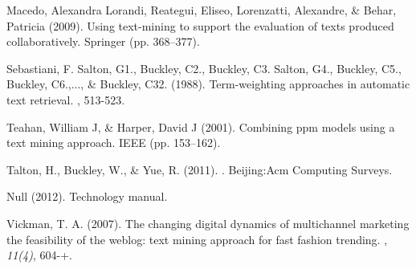 \begin{thebibliography}{}
Macedo, Alexandra Lorandi, Reategui, Eliseo, Lorenzatti, Alexandre, \& Behar, Patricia (2009).
\newblock Using text-mining to support the evaluation of texts produced collaboratively. Springer (pp. 368--377).

Sebastiani, F. Salton, G1., Buckley, C2., Buckley, C3. Salton, G4., Buckley, C5., Buckley, C6.,..., \& Buckley, C32. (1988).
\newblock Term-weighting approaches in automatic text retrieval.
, 513-523.

Teahan, William J, \& Harper, David J (2001).
\newblock Combining ppm models using a text mining approach. IEEE (pp. 153--162).

Talton, H., Buckley, W., \& Yue, R. (2011).
. Beijing:Acm Computing Surveys.

Null (2012).
\newblock Technology manual.

Vickman, T. A. (2007).
\newblock The changing digital dynamics of multichannel marketing the feasibility of the weblog: text mining approach for fast fashion trending.
, {\em 11}{\em (4)}, 604-+.

\end{thebibliography}
    
